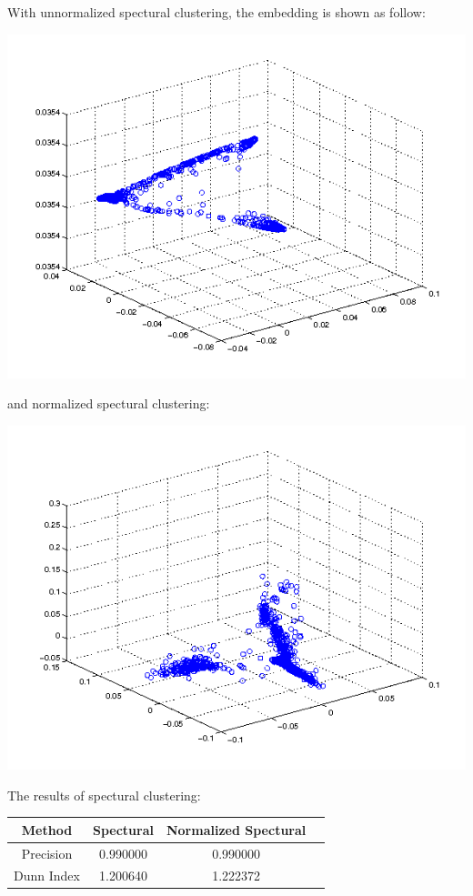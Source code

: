 \documentclass{article}[11pt]
\begin{document}
\section{}
\subsection{}
With unnormalized spectural clustering, the embedding is shown as follow:
\begin{center}
  \includegraphics[width=.7\textwidth]{spec}
\end{center}
and normalized spectural clustering:
\begin{center}
  \includegraphics[width=.7\textwidth]{normspec}
\end{center}

The results of spectural clustering: 
\begin{center}
\begin{tabular}[h]{c|ccc}
  \hline
  Method & Spectural & Normalized Spectural \\ \hline
  Precision & 0.990000 & 0.990000 \\
  Dunn Index & 1.200640 & 1.222372 \\ \hline
\end{tabular}
\end{center}
\end{document}
